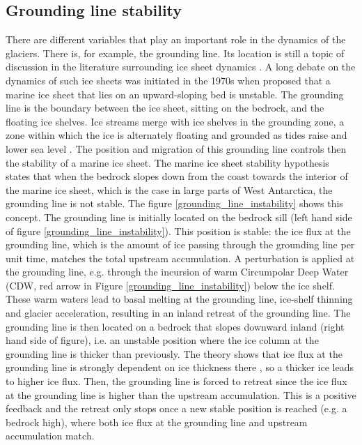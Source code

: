 \documentclass{article}
\begin{document}
\subsection{Grounding line stability}
\label{grounding_line_stability}
There are different variables that play an important role in the dynamics of the glaciers. There is, for example, the grounding line. Its location is still a topic of discussion in the literature surrounding ice sheet dynamics \cite[]{goldberg2018representing}. A long debate on the dynamics of such ice sheets was initiated in the 1970s when \cite[]{weertman1974stability} proposed that a marine ice sheet that lies on an upward-sloping bed is unstable.
The grounding line is the boundary between the ice sheet, sitting on the bedrock, and the floating ice shelves. Ice streams merge with ice shelves in the grounding zone, a zone within which the ice is alternately ﬂoating and grounded as tides raise and lower sea level \cite[]{hooke2019principles}. The position and migration of this grounding line controls then the stability of a marine ice sheet.
The marine ice sheet stability hypothesis states that when the bedrock slopes down from the coast towards the interior of the marine ice sheet, which is the case in large parts of West Antarctica, the grounding line is not stable. The figure \ref{grounding_line_instability} shows this concept. The grounding line is initially located on the bedrock sill (left hand side of figure \ref{grounding_line_instability}). This position is stable: the ice flux at the grounding line, which is the amount of ice passing through the grounding line per unit time, matches the total upstream accumulation.
A perturbation is applied at the grounding line, e.g. through the incursion of warm Circumpolar Deep Water (CDW, red arrow in Figure \ref{grounding_line_instability}) below the ice shelf. These warm waters lead to basal melting at the grounding line, ice-shelf thinning and glacier acceleration, resulting in an inland retreat of the grounding line. The grounding line is then located on a bedrock that slopes downward inland (right hand side of figure), i.e. an unstable position where the ice column at the grounding line is thicker than previously. The theory shows that ice flux at the grounding line is strongly dependent on ice thickness there \cite[]{weertman1974stability, schoof2007ice}, so a thicker ice leads to higher ice flux. Then, the grounding line is forced to retreat since the ice flux at the grounding line is higher than the upstream accumulation. This is a positive feedback and the retreat only stops once a new stable position is reached (e.g. a bedrock high), where both ice flux at the grounding line and upstream accumulation match.
\end{document}
